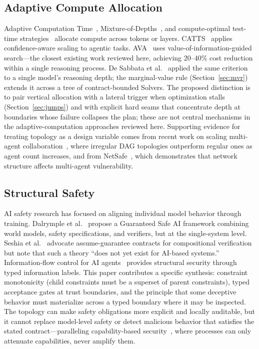 \documentclass[11pt]{article}
\begin{document}
\subsection{Adaptive Compute Allocation}

Adaptive Computation Time~\cite{Graves2016}, Mixture-of-Depths~\cite{Raposo2024}, and compute-optimal test-time strategies~\cite{Snell2024} allocate compute across tokens or layers. CATTS~\cite{CATTS2026} applies confidence-aware scaling to agentic tasks. AVA~\cite{AVA2025} uses value-of-information-guided search---the closest existing work reviewed here, achieving 20--40\% cost reduction within a single reasoning process. De Sabbata et al.~\cite{DeSabbata2024} applied the same criterion to a single model's reasoning depth; the marginal-value rule (Section~\ref{sec:mvr}) extends it across a tree of contract-bounded Solvers. The proposed distinction is to pair vertical allocation with a lateral trigger when optimization stalls (Section~\ref{sec:jumps}) and with explicit hard seams that concentrate depth at boundaries whose failure collapses the plan; these are not central mechanisms in the adaptive-computation approaches reviewed here. Supporting evidence for treating topology as a design variable comes from recent work on scaling multi-agent collaboration~\cite{QianICLR2025}, where irregular DAG topologies outperform regular ones as agent count increases, and from NetSafe~\cite{NetSafe2025}, which demonstrates that network structure affects multi-agent vulnerability.

\subsection{Structural Safety}

AI safety research has focused on aligning individual model behavior through training. Dalrymple et al.~\cite{Dalrymple2024} propose a Guaranteed Safe AI framework combining world models, safety specifications, and verifiers, but at the single-system level. Seshia et al.~\cite{Seshia2022} advocate assume-guarantee contracts for compositional verification but note that such a theory ``does not yet exist for AI-based systems.'' Information-flow control for AI agents~\cite{Fides2025} provides structural security through typed information labels. This paper contributes a specific synthesis: constraint monotonicity (child constraints must be a superset of parent constraints), typed acceptance gates at trust boundaries, and the principle that some deceptive behavior must materialize across a typed boundary where it may be inspected. The topology can make safety obligations more explicit and locally auditable, but it cannot replace model-level safety or detect malicious behavior that satisfies the stated contract---paralleling capability-based security~\cite{Dennis1966}, where processes can only attenuate capabilities, never amplify them.
\end{document}
